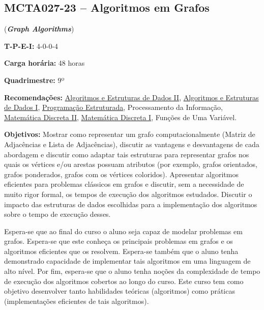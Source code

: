 \documentclass[class=article, crop=false]{standalone}
\begin{document}
\subsection{MCTA027-23 -- Algoritmos em Grafos}
\label{disc:ag}

(\textbf{\textit{Graph Algorithms}})

\begin{center}
    \begin{minipage}{0.85\textwidth}
        \textbf{T-P-E-I:} 4-0-0-4
        
        \textbf{Carga horária:} 48 horas
        
        \textbf{Quadrimestre:} 9º
        
        \textbf{Recomendações:} 
        \hyperref[disc:aedII]{Algoritmos e Estruturas de Dados II},
        \hyperref[disc:aedI]{Algoritmos e Estruturas de Dados I},
        \hyperref[disc:pe]{Programação Estruturada},
        Processamento da Informação,
        \hyperref[disc:mdII]{Matemática Discreta II},
        \hyperref[disc:mdI]{Matemática Discreta I},
        Funções de Uma Variável.
    \end{minipage}
\end{center}

\textbf{Objetivos:}
Mostrar como representar um grafo computacionalmente (Matriz de Adjacências e
Lista de Adjacências), discutir as vantagens e desvantagens de cada abordagem e
discutir como adaptar tais estruturas para representar grafos nos quais os
vértices e/ou arestas possuam atributos (por exemplo, grafos orientados, grafos
ponderados, grafos com os vértices coloridos).
Apresentar algoritmos eficientes para problemas clássicos em grafos e discutir,
sem a necessidade de muito rigor formal, os tempos de execução dos algoritmos
estudados. 
Discutir o impacto das estruturas de dados escolhidas para a implementação dos
algoritmos sobre o tempo de execução desses.

Espera-se que ao final do curso o aluno seja capaz de modelar problemas em
grafos. Espera-se que este conheça os principais problemas em grafos e os
algoritmos eficientes que os resolvem. Espera-se também que o aluno tenha
demonstrado capacidade de implementar tais algoritmos em uma linguagem de alto
nível. Por fim, espera-se que o aluno tenha noções da complexidade de tempo de
execução dos algoritmos cobertos ao longo do curso. Este curso tem como
objetivo desenvolver tanto habilidades teóricas (algoritmos) como práticas
(implementações eficientes de tais algoritmos).
\end{document}
